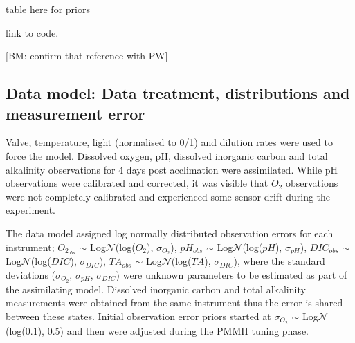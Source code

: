 \documentclass{ruthesis}
\begin{document}
table here for priors    

link to code.


[BM: confirm that reference with PW]


\subsection{Data model: Data treatment, distributions and measurement error}

Valve, temperature, light (normalised to 0/1) and dilution rates were used to force the model.
Dissolved oxygen, pH, dissolved inorganic carbon and total alkalinity observations for 4 days post acclimation were assimilated. 
While pH observations were calibrated and corrected, it was visible that $O_2$ observations were not completely calibrated and experienced some sensor drift during the experiment. %

The data model assigned log normally distributed observation errors for each instrument;
$O_{2_{obs}}$ $\sim$ Log$\mathcal{N}$(log($O_2$), $\sigma_{O_2}$), $pH_{obs}$ $\sim$ Log$\mathcal{N}$(log($pH$),  $\sigma_{pH}$), $DIC_{obs}$ $\sim$ Log$\mathcal{N}$(log($DIC$), $\sigma_{DIC}$), $TA_{obs}$ $\sim$ Log$\mathcal{N}$(log($TA$), $\sigma_{DIC}$), where the standard deviations ($\sigma_{O_2}$, $\sigma_{pH}$, $\sigma_{DIC}$) were unknown parameters to be estimated as part of the assimilating model. Dissolved inorganic carbon and total alkalinity measurements were obtained from the same instrument thus the error is shared between these states. Initial observation error priors started at $\sigma_{O_2}$ $\sim$ Log$\mathcal{N}$(log(0.1), 0.5) and then were adjusted during the PMMH tuning phase. 
\end{document}
